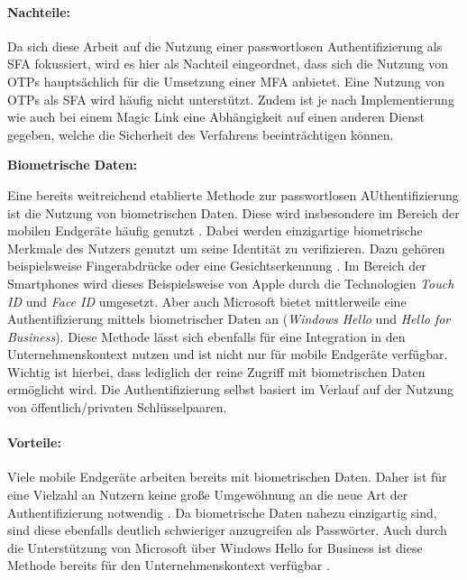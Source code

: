 \paragraph*{Nachteile:} Da sich diese Arbeit auf die Nutzung einer passwortlosen Authentifizierung als \ac{SFA} fokussiert, wird es hier als Nachteil eingeordnet, dass sich die Nutzung von \ac{OTP}s hauptsächlich für die Umsetzung einer \ac{MFA} anbietet. Eine Nutzung von \ac{OTP}s als \ac{SFA} wird häufig nicht unterstützt. Zudem ist je nach Implementierung wie auch bei einem Magic Link eine Abhängigkeit auf einen anderen Dienst gegeben, welche die Sicherheit des Verfahrens beeinträchtigen können.

\textbf{Biometrische Daten:}

Eine bereits weitreichend etablierte Methode zur passwortlosen AUthentifizierung ist die Nutzung von biometrischen Daten. Diese wird insbesondere im Bereich der mobilen Endgeräte häufig genutzt \cite{parmar2022comprehensive}. Dabei werden einzigartige biometrische Merkmale des Nutzers genutzt um seine Identität zu verifizieren. Dazu gehören beispielsweise Fingerabdrücke oder eine Gesichtserkennung \cite{parmar2022comprehensive}. Im Bereich der Smartphones wird dieses Beispielsweise von Apple durch die Technologien \textit{Touch ID} und \textit{Face ID} umgesetzt. Aber auch Microsoft bietet mittlerweile eine Authentifizierung mittels biometrischer Daten an (\textit{Windows Hello} und \textit{Hello for Business}). Diese Methode lässt sich ebenfalls für eine Integration in den Unternehmenskontext nutzen und ist nicht nur für mobile Endgeräte verfügbar. Wichtig ist hierbei, dass lediglich der reine Zugriff mit biometrischen Daten ermöglicht wird. Die Authentifizierung selbst basiert im Verlauf auf der Nutzung von öffentlich/privaten Schlüsselpaaren.

\paragraph*{Vorteile:} Viele mobile Endgeräte arbeiten bereits mit biometrischen Daten. Daher ist für eine Vielzahl an Nutzern keine große Umgewöhnung an die neue Art der Authentifizierung notwendig \cite{parmar2022comprehensive}. Da biometrische Daten nahezu einzigartig sind, sind diese ebenfalls deutlich schwieriger anzugreifen als Passwörter. Auch durch die Unterstützung von Microsoft über Windows Hello for Business ist diese Methode bereits für den Unternehmenskontext verfügbar \cite{parmar2022comprehensive}.

